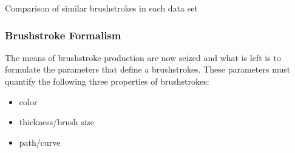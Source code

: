 \begin{marginfigure}
{        %
    }\qquad
    \qquad
    \caption[]{Comparison of similar brushstrokes in each data set}
\end{marginfigure}

\subsubsection{Brushstroke Formalism}
The means of brushstroke production are now seized and what is left is to formulate the parameters that define a brushstrokes.
These parameters must quantify the following three properties of brushstrokes:
\begin{itemize}
    \item color
    \item thickness/brush size
    \item path/curve
\end{itemize}

